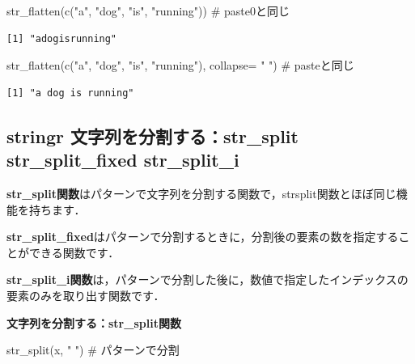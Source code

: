 \documentclass[
  letterpaper,
  DIV=11,
  numbers=noendperiod]{scrreprt}
\newenvironment{Shaded}{\begin{snugshade}}{\end{snugshade}}
\newcommand{\AttributeTok}[1]{\textcolor[rgb]{0.40,0.45,0.13}{#1}}
\newcommand{\CommentTok}[1]{\textcolor[rgb]{0.37,0.37,0.37}{#1}}
\newcommand{\FunctionTok}[1]{\textcolor[rgb]{0.28,0.35,0.67}{#1}}
\newcommand{\NormalTok}[1]{\textcolor[rgb]{0.00,0.23,0.31}{#1}}
\newcommand{\StringTok}[1]{\textcolor[rgb]{0.13,0.47,0.30}{#1}}
\begin{document}
\begin{Shaded}
\begin{Highlighting}[]
\FunctionTok{str\_flatten}\NormalTok{(}\FunctionTok{c}\NormalTok{(}\StringTok{"a"}\NormalTok{, }\StringTok{"dog"}\NormalTok{, }\StringTok{"is"}\NormalTok{, }\StringTok{"running"}\NormalTok{)) }\CommentTok{\# paste0と同じ}
\end{Highlighting}
\end{Shaded}

\begin{verbatim}
[1] "adogisrunning"
\end{verbatim}

\begin{Shaded}
\begin{Highlighting}[]
\FunctionTok{str\_flatten}\NormalTok{(}\FunctionTok{c}\NormalTok{(}\StringTok{"a"}\NormalTok{, }\StringTok{"dog"}\NormalTok{, }\StringTok{"is"}\NormalTok{, }\StringTok{"running"}\NormalTok{), }\AttributeTok{collapse=} \StringTok{" "}\NormalTok{) }\CommentTok{\# pasteと同じ}
\end{Highlighting}
\end{Shaded}

\begin{verbatim}
[1] "a dog is running"
\end{verbatim}

\hypertarget{stringr-ux6587ux5b57ux5217ux3092ux5206ux5272ux3059ux308bstr_split-str_split_fixed-str_split_i}{%
\subsection{stringr 文字列を分割する：str\_split str\_split\_fixed
str\_split\_i}\label{stringr-ux6587ux5b57ux5217ux3092ux5206ux5272ux3059ux308bstr_split-str_split_fixed-str_split_i}}

\textbf{str\_split関数}はパターンで文字列を分割する関数で，strsplit関数とほぼ同じ機能を持ちます．

\textbf{str\_split\_fixed}はパターンで分割するときに，分割後の要素の数を指定することができる関数です．

\textbf{str\_split\_i関数}は，パターンで分割した後に，数値で指定したインデックスの要素のみを取り出す関数です．

\textbf{文字列を分割する：str\_split関数}

\begin{Shaded}
\begin{Highlighting}[]
\FunctionTok{str\_split}\NormalTok{(x, }\StringTok{" "}\NormalTok{) }\CommentTok{\# パターンで分割}
\end{Highlighting}
\end{Shaded}
\end{document}
